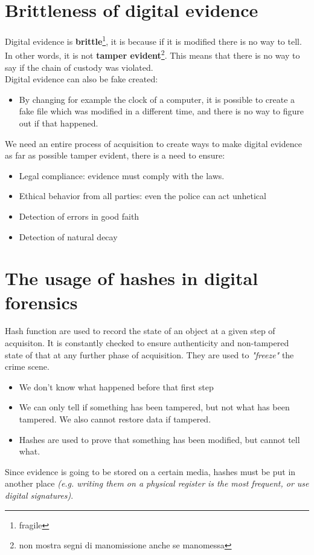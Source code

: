 \section{Brittleness of digital evidence}
    Digital evidence is \textbf{brittle}\footnote{fragile}, it is because if it is modified there is no way to tell. In other words, it is not \textbf{tamper evident}\footnote{non mostra segni di manomissione anche se manomessa}. This means that there is no way to say if the chain of custody was violated.\\
    Digital evidence can also be fake created:
    \begin{itemize}
        \item By changing for example the clock of a computer, it is possible to create a fake file which was modified in a different time, and there is no way to figure out if that happened.
    \end{itemize}
    We need an entire process of acquisition to create ways to make digital evidence as far as possible tamper evident, there is a need to ensure:
    \begin{itemize}
        \item Legal compliance: evidence must comply with the laws.
        \item Ethical behavior from all parties: even the police can act unhetical
        \item Detection of errors in good faith 
        \item Detection of natural decay
    \end{itemize}
\section{The usage of hashes in digital forensics}
    Hash function are used to record the state of an object at a given step of acquisiton. It is constantly checked to ensure authenticity and non-tampered state of that at any further phase of acquisition. They are used to \textit{"freeze"} the crime scene.
    \begin{itemize}
        \item We don't know what happened before that first step
        \item We can only tell if something has been tampered, but not what has been tampered. We also cannot restore data if tampered.
        \item Hashes are used to prove that something has been modified, but cannot tell what.
    \end{itemize}   
    Since evidence is going to be stored on a certain media, hashes must be put in another place \textit{(e.g. writing them on a physical register is the most frequent, or use digital signatures)}.
